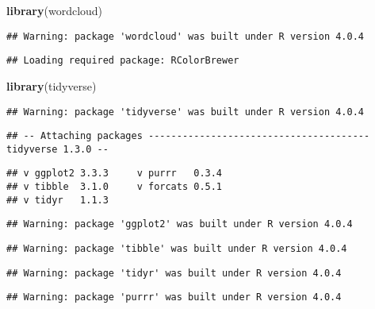 \documentclass[
]{article}
\newenvironment{Shaded}{\begin{snugshade}}{\end{snugshade}}
\newcommand{\KeywordTok}[1]{\textcolor[rgb]{0.13,0.29,0.53}{\textbf{#1}}}
\newcommand{\NormalTok}[1]{#1}
\begin{document}
\begin{Shaded}
\begin{Highlighting}[]
\KeywordTok{library}\NormalTok{(wordcloud)}
\end{Highlighting}
\end{Shaded}

\begin{verbatim}
## Warning: package 'wordcloud' was built under R version 4.0.4
\end{verbatim}

\begin{verbatim}
## Loading required package: RColorBrewer
\end{verbatim}

\begin{Shaded}
\begin{Highlighting}[]
\KeywordTok{library}\NormalTok{(tidyverse)}
\end{Highlighting}
\end{Shaded}

\begin{verbatim}
## Warning: package 'tidyverse' was built under R version 4.0.4
\end{verbatim}

\begin{verbatim}
## -- Attaching packages --------------------------------------- tidyverse 1.3.0 --
\end{verbatim}

\begin{verbatim}
## v ggplot2 3.3.3     v purrr   0.3.4
## v tibble  3.1.0     v forcats 0.5.1
## v tidyr   1.1.3
\end{verbatim}

\begin{verbatim}
## Warning: package 'ggplot2' was built under R version 4.0.4
\end{verbatim}

\begin{verbatim}
## Warning: package 'tibble' was built under R version 4.0.4
\end{verbatim}

\begin{verbatim}
## Warning: package 'tidyr' was built under R version 4.0.4
\end{verbatim}

\begin{verbatim}
## Warning: package 'purrr' was built under R version 4.0.4
\end{verbatim}
\end{document}
